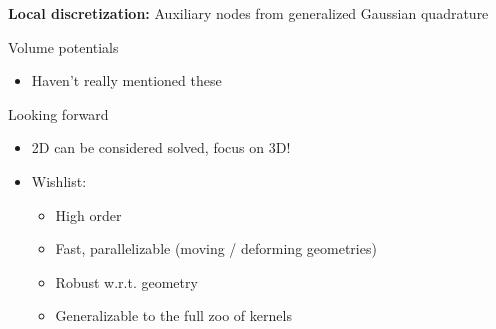 \documentclass[t]{beamer}
\begin{document}
\begin{frame}
  \textbf{Local discretization:} Auxiliary nodes from generalized Gaussian quadrature


\end{frame}

\begin{frame}{Volume potentials}
  \begin{itemize}
  \item Haven't really mentioned these
  \end{itemize}
\end{frame}

\begin{frame}{Looking forward}
  \begin{itemize}
  \item 2D can be considered solved, focus on 3D!
  \item Wishlist:
    \begin{itemize}
    \item High order
    \item Fast, parallelizable (moving / deforming geometries)
    \item Robust w.r.t. geometry
    \item Generalizable to the full zoo of kernels
    \end{itemize}
  \end{itemize}
\end{frame}
\end{document}
